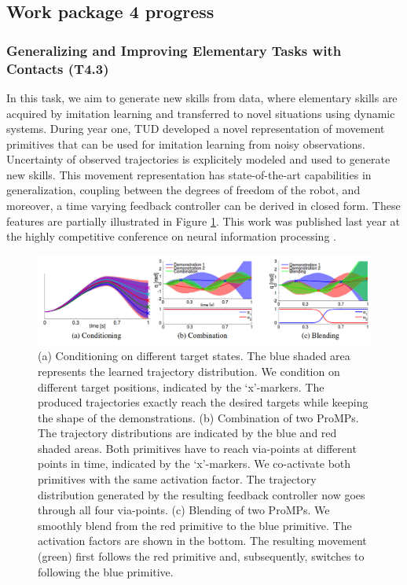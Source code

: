 \documentclass[12pt,a4paper,twoside]{article}
\begin{document}
\subsection{Work package 4 progress}

\subsubsection{Generalizing and Improving Elementary Tasks with Contacts (T4.3)}

In this task, we aim to generate new skills from data, where elementary skills 
are acquired by imitation learning and transferred to novel situations using 
dynamic systems. During year one, TUD developed a novel representation of 
movement primitives that can be used for imitation learning from noisy observations.
Uncertainty of observed trajectories is explicitely modeled and used to generate new skills.
This movement representation has state-of-the-art capabilities in generalization, 
coupling between the degrees of freedom of the robot, and moreover, 
a time varying feedback controller can be derived in closed form. 
These features are partially illustrated in Figure \ref{fig:promps}.
This work was published
last year at the highly competitive conference on neural information processing \cite{Paraschos_NIPS_2013}.

\begin{figure}[!ht]
\centering
\includegraphics[width=\textwidth]{./images/ProMPs.png}
 \caption{(a)
Conditioning on different target states. The blue shaded area represents the learned
trajectory distribution. We condition on different target positions, indicated by the ‘x’-markers. The
produced trajectories exactly reach the desired targets while keeping the shape of the demonstrations.
(b)
Combination of two ProMPs. The trajectory distributions are indicated by the blue and red
shaded areas. Both primitives have to reach via-points at different points in time, indicated by
the ‘x’-markers. We co-activate both primitives with the same activation factor. The trajectory
distribution generated by the resulting feedback controller now goes through all four via-points.
(c)
Blending of two ProMPs. We smoothly blend from the red primitive to the blue primitive. The
activation factors are shown in the bottom. The resulting movement (green) first follows the red
primitive and, subsequently, switches to following the blue primitive.
}
\label{fig:promps}
\end{figure}
\end{document}
